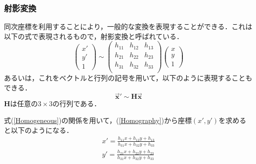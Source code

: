 \documentclass[openright]{nitocs}
\numberwithin{equation}{section}
\begin{document}
            \subsubsection{射影変換}
                同次座標を利用することにより，一般的な変換を表現することができる．これは以下の式で表現されるもので，射影変換と呼ばれている\cite{DIP}．
                \begin{equation} %
                    \left(
                        \begin{array}{ccc}
                        x'\\
                        y'\\
                        1
                        \end{array}
                    \right)\sim
                    \left(
                        \begin{array}{ccc}
                        h_{11} & h_{12} & h_{13}\\
                        h_{21} & h_{22} & h_{23}\\
                        h_{31} & h_{32} & h_{33}\\
                        \end{array}
                    \right)
                    \left(
                        \begin{array}{ccc}
                        x\\
                        y\\
                        1
                        \end{array}
                    \right)
                    \label{Homography}
                \end{equation}
                あるいは，これをベクトルと行列の記号を用いて，以下のように表現することもできる．
                \begin{equation}
                    \bm{\vec{x}'} \sim \bm{H\vec{x}}
                \end{equation}
                $\bm{H}$は任意の$3\times3$の行列である．

                式(\ref{Homogeneous})の関係を用いて，(\ref{Homography})から座標$(x',y')$を求めると以下のようになる．
                \begin{equation} %
                    \begin{split} %
                        x' = \frac{h_{11}x+h_{12}y+h_{13}}{h_{31}x+h_{32}y+h_{33}} \\ 
                        y' = \frac{h_{21}x+h_{22}y+h_{23}}{h_{31}x+h_{32}y+h_{33}} \\ 
                    \end{split}
                \end{equation}
\end{document}
